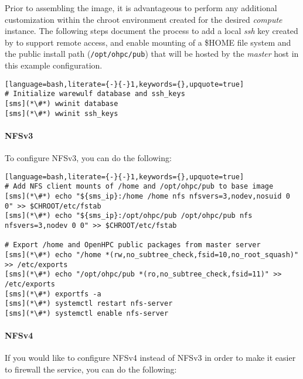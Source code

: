 Prior to assembling the image, it is advantageous to perform any additional
customization within the chroot environment created for the desired {\em
 compute} instance. The following steps document the process to add a local
{\em ssh} key created by \Warewulf{} to support remote access, 
and enable \NFS{}
mounting of a \$HOME file system and the public \OHPC{} install path
(\texttt{/opt/ohpc/pub}) that will be hosted by the {\em master} host in this
example configuration.

\vspace*{0.15cm}
\else
\vspace*{0.15cm}
\fi

\begin{lstlisting}[language=bash,literate={-}{-}1,keywords={},upquote=true]
# Initialize warewulf database and ssh_keys
[sms](*\#*) wwinit database
[sms](*\#*) wwinit ssh_keys
\end{lstlisting}

\paragraph{NFSv3}
To configure NFSv3, you can do the following:

\begin{lstlisting}[language=bash,literate={-}{-}1,keywords={},upquote=true]
# Add NFS client mounts of /home and /opt/ohpc/pub to base image
[sms](*\#*) echo "${sms_ip}:/home /home nfs nfsvers=3,nodev,nosuid 0 0" >> $CHROOT/etc/fstab
[sms](*\#*) echo "${sms_ip}:/opt/ohpc/pub /opt/ohpc/pub nfs nfsvers=3,nodev 0 0" >> $CHROOT/etc/fstab

# Export /home and OpenHPC public packages from master server
[sms](*\#*) echo "/home *(rw,no_subtree_check,fsid=10,no_root_squash)" >> /etc/exports
[sms](*\#*) echo "/opt/ohpc/pub *(ro,no_subtree_check,fsid=11)" >> /etc/exports
[sms](*\#*) exportfs -a
[sms](*\#*) systemctl restart nfs-server
[sms](*\#*) systemctl enable nfs-server
\end{lstlisting}

\paragraph{NFSv4}
If you would like to configure NFSv4 instead of NFSv3 in order to make
it easier to firewall the service, you can do the following:


